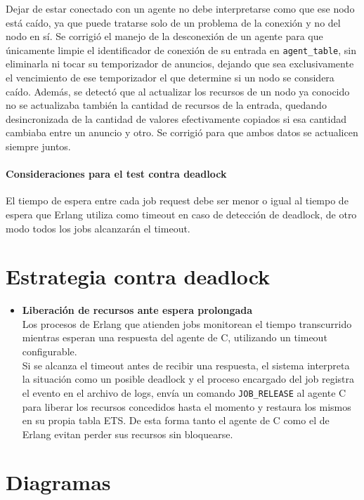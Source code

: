 \documentclass[a4paper,10pt]{article}
\begin{document}
Dejar de estar conectado con un agente no debe interpretarse como que ese nodo está caído, ya que puede tratarse solo de un problema de la conexión y no del nodo en sí. Se corrigió el manejo de la desconexión de un agente para que únicamente limpie el identificador de conexión de su entrada en \texttt{agent\_table}, sin eliminarla ni tocar su temporizador de anuncios, dejando que sea exclusivamente el vencimiento de ese temporizador el que determine si un nodo se considera caído. Además, se detectó que al actualizar los recursos de un nodo ya conocido no se actualizaba también la cantidad de recursos de la entrada, quedando desincronizada de la cantidad de valores efectivamente copiados si esa cantidad cambiaba entre un anuncio y otro. Se corrigió para que ambos datos se actualicen siempre juntos.

\paragraph{Consideraciones para el test contra deadlock}

El tiempo de espera entre cada job request debe ser menor o igual al tiempo de espera que Erlang utiliza como timeout en caso de detección de deadlock, de otro modo todos los jobs alcanzarán el timeout.

\section{Estrategia contra deadlock}

\begin{itemize}
\item \textbf{Liberación de recursos ante espera prolongada}\\
Los procesos de Erlang que atienden jobs monitorean el tiempo transcurrido mientras esperan una respuesta del agente de C, utilizando un timeout configurable.\\
Si se alcanza el timeout antes de recibir una respuesta, el sistema interpreta la situación como un posible deadlock y el proceso encargado del job registra el evento en el archivo de logs, envía un comando \texttt{JOB\_RELEASE} al agente C para liberar los recursos concedidos hasta el momento y restaura los mismos en su propia tabla ETS. De esta forma tanto el agente de C como el de Erlang evitan perder sus recursos sin bloquearse.
\end{itemize}

\section{Diagramas}
\end{document}
